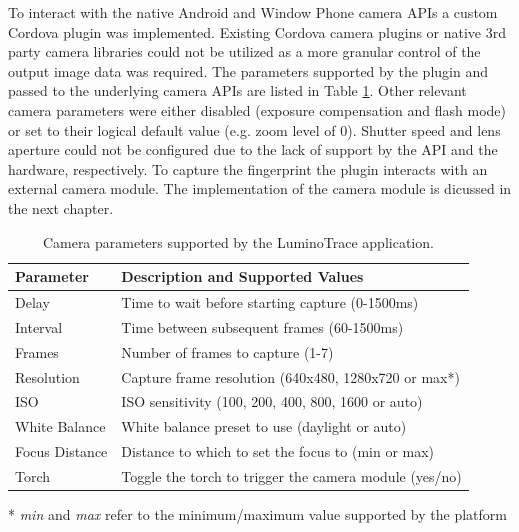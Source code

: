 \documentclass[thesis.tex]{subfiles}
\begin{document}
To interact with the native Android and Window Phone camera APIs a custom Cordova plugin was implemented. Existing Cordova camera plugins or native 3rd party camera libraries could not be utilized as a more granular control of the output image data was required. The parameters supported by the plugin and passed to the underlying camera APIs are listed in Table \ref{table:camera-parameters}. Other relevant camera parameters were either disabled (exposure compensation and flash mode) or set to their logical default value (e.g. zoom level of 0). Shutter speed and lens aperture could not be configured due to the lack of support by the API and the hardware, respectively. To capture the fingerprint the plugin interacts with an external camera module. The implementation of the camera module is dicussed in the next chapter.

\begin{table}[ht]
	\caption{Camera parameters supported by the LuminoTrace application.} \label{table:camera-parameters}

	\begin{center}
	\begin{tabular}{| m{2.75cm} | m{9.75cm} |}

		\hline
		\textbf{Parameter}	& \textbf{Description and Supported Values} \\ \hline
		Delay				& Time to wait before starting capture (0-1500ms) \\
		\hline
		Interval 			& Time between subsequent frames (60-1500ms) \\
		\hline
		Frames 				& Number of frames to capture (1-7) \\
		\hline
		Resolution 			& Capture frame resolution (640x480, 1280x720 or max\footnotesize{*}) \\
		\hline
		ISO 				& ISO sensitivity (100, 200, 400, 800, 1600 or auto) \\
		\hline
		White Balance		& White balance preset to use (daylight or auto) \\
		\hline
		Focus Distance		& Distance to which to set the focus to (min or max) \\
		\hline
		Torch 			& Toggle the torch to trigger the camera module (yes/no) \\
		\hline
	\end{tabular}
	\end{center}
	\scriptsize{*} \small{\emph{min} and \emph{max} refer to the minimum/maximum value supported by the platform}
\end{table}
\end{document}
